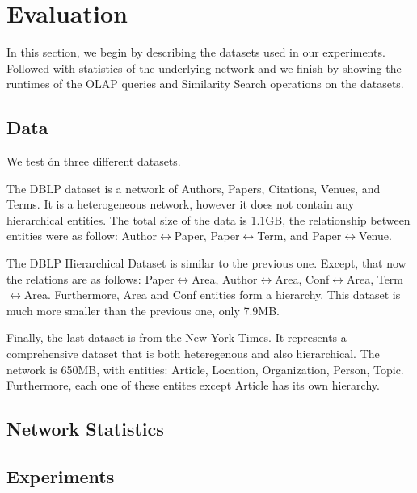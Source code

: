 \section{Evaluation}
\label{sec:eval}

In this section, we begin by describing the datasets used in our experiments.
Followed with statistics of the underlying network and we finish by showing
the runtimes of the OLAP queries and Similarity Search operations on the datasets.

\subsection{Data}

We test \h on three different datasets.

The DBLP dataset is a network of Authors, Papers, Citations, Venues, and 
Terms. It is a heterogeneous network, however it does not contain any 
hierarchical entities. The total size of the data is 1.1GB, the relationship
between entities were as follow: Author$\leftrightarrow$Paper,
Paper$\leftrightarrow$Term, and Paper$\leftrightarrow$Venue.

The DBLP Hierarchical Dataset is similar to the previous one. Except, that now
the relations are as follows: Paper$\leftrightarrow$Area, Author$\leftrightarrow$Area,
Conf$\leftrightarrow$Area, Term$\leftrightarrow$Area. 
Furthermore, Area and Conf entities form a hierarchy.
This dataset is much more smaller than the previous one, only 7.9MB.

Finally, the last dataset is from the New York Times. It represents a comprehensive
dataset that is both heteregenous and also hierarchical. The network is 650MB, with
entities: Article, Location, Organization, Person, Topic. Furthermore, each one of these
entites except Article has its own hierarchy.

\subsection {Network Statistics}


\subsection {Experiments}


